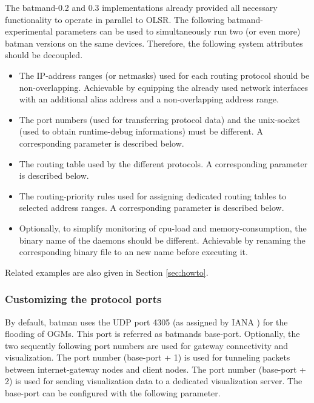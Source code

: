 \documentclass[11pt]{article}
\begin{document}
The batmand-0.2 and 0.3 implementations already provided all necessary functionality to operate in parallel to OLSR. 
%
The following batmand-experimental parameters can be used to simultaneously run two (or even more) batman versions on the same devices.
Therefore, the following system attributes should be decoupled.
\begin{itemize}

 \item The IP-address ranges (or netmasks) used for each routing protocol should be non-overlapping. Achievable by equipping the already used network interfaces with an additional alias address and a non-overlapping address range.
  
 \item The port numbers (used for transferring protocol data) and the unix-socket (used to obtain runtime-debug informations) must be different. A corresponding parameter is described below.

 \item The routing table used by the different protocols. A corresponding parameter is described below.

 \item The routing-priority rules used for assigning dedicated routing tables to selected address ranges. A corresponding parameter is described below.

 \item Optionally, to simplify monitoring of cpu-load and memory-consumption, the binary name of the daemons should be different. Achievable by renaming the corresponding binary file to an new name before executing it.

\end{itemize}
%
Related examples are also given in Section \ref{sec:howto}.

\subsubsection{Customizing the protocol ports}

By default, batman uses the UDP port 4305 (as assigned by IANA \cite{iana-ports}) for the flooding of OGMs.
This port is referred as batmands base-port.
%
Optionally, the two sequently following port numbers are used for gateway connectivity and visualization.
%
The port number (base-port + 1) is used for tunneling packets between internet-gateway nodes and client nodes. 
The port number (base-port + 2) is used for sending visualization data to a dedicated visualization server.
The base-port can be configured with the following parameter.
\end{document}
